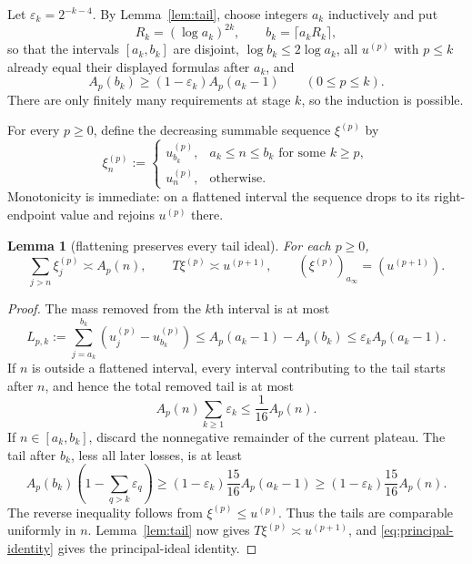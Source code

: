 \documentclass[11pt]{article}
\newtheorem{lemma}{Lemma}
\newcommand{\Tp}{T}
\begin{document}
Let $\varepsilon_k=2^{-k-4}$.  By Lemma~\ref{lem:tail}, choose integers
$a_k$ inductively and put
\[
 R_k=(\log a_k)^{2k},\qquad b_k=\lceil a_kR_k\rceil,
\]
so that the intervals $[a_k,b_k]$ are disjoint, $\log b_k\le2\log a_k$,
all $u^{(p)}$ with $p\le k$ already equal their displayed formulas after
$a_k$, and
\begin{equation}\label{eq:small-loss}
 A_p(b_k)\ge(1-\varepsilon_k)A_p(a_k-1)
 \qquad(0\le p\le k).
\end{equation}
There are only finitely many requirements at stage $k$, so the induction is
possible.

For every $p\ge0$, define the decreasing summable sequence $\xi^{(p)}$ by
\begin{equation}\label{eq:flatten}
 \xi^{(p)}_n:=
 \begin{cases}
  u^{(p)}_{b_k},&a_k\le n\le b_k\text{ for some }k\ge p,\\
  u^{(p)}_n,&\text{otherwise}.
 \end{cases}
\end{equation}
Monotonicity is immediate: on a flattened interval the sequence drops to its
right-endpoint value and rejoins $u^{(p)}$ there.

\begin{lemma}[flattening preserves every tail ideal]\label{lem:flatten}
For each $p\ge0$,
\[
        \sum_{j>n}\xi^{(p)}_j\asymp A_p(n),
        \qquad
        \Tp\xi^{(p)}\asymp u^{(p+1)},
        \qquad
        (\xi^{(p)})_{a_\infty}=(u^{(p+1)}).
\]
\end{lemma}

\begin{proof}
The mass removed from the $k$th interval is at most
\[
 L_{p,k}:=\sum_{j=a_k}^{b_k}
       (u^{(p)}_j-u^{(p)}_{b_k})
 \le A_p(a_k-1)-A_p(b_k)
 \le\varepsilon_kA_p(a_k-1).
\]
If $n$ is outside a flattened interval, every interval contributing to the
tail starts after $n$, and hence the total removed tail is at most
\[
 A_p(n)\sum_{k\ge1}\varepsilon_k\le\frac1{16}A_p(n).
\]
If $n\in[a_k,b_k]$, discard the nonnegative remainder of the current plateau.
The tail after $b_k$, less all later losses, is at least
\[
 A_p(b_k)\left(1-\sum_{q>k}\varepsilon_q\right)
 \ge (1-\varepsilon_k)\frac{15}{16}A_p(a_k-1)
 \ge (1-\varepsilon_k)\frac{15}{16}A_p(n).
\]
The reverse inequality follows from $\xi^{(p)}\le u^{(p)}$.  Thus the tails
are comparable uniformly in $n$.  Lemma~\ref{lem:tail} now gives
$\Tp\xi^{(p)}\asymp u^{(p+1)}$, and
\eqref{eq:principal-identity} gives the principal-ideal identity.
\end{proof}
\end{document}
